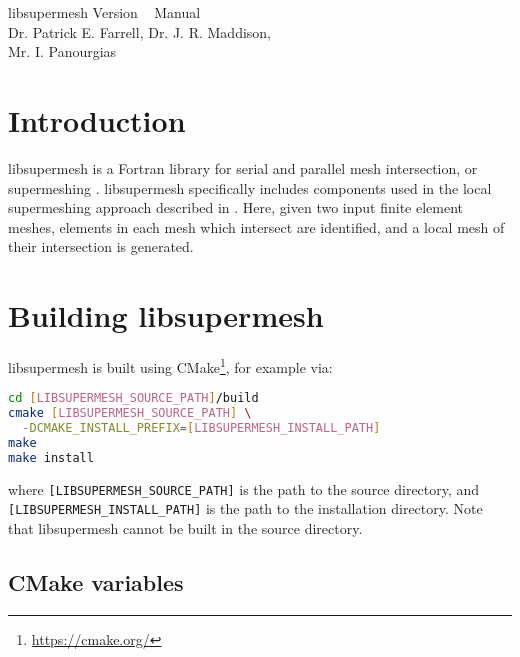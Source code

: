 \documentclass{article}
\begin{document}
\begin{titlepage}
\begin{center}

\Huge{libsupermesh Version \version~ Manual} \\[0.15\textheight]
\Large{Dr. Patrick E. Farrell, Dr. J. R. Maddison, \\ Mr. I. Panourgias}

\end{center}
\end{titlepage}

\tableofcontents

\section{Introduction}

libsupermesh is a Fortran library for serial and parallel mesh intersection, or
supermeshing \citep{farrell2009,farrell2009a}. libsupermesh specifically
includes components used in the local supermeshing approach described in
\citet{farrell2011}. Here, given two input finite element meshes, elements in
each mesh which intersect are identified, and a local mesh of their intersection
is generated.

\section{Building libsupermesh}

libsupermesh is built using CMake\footnote{\url{https://cmake.org/}}, for
example via:
\begin{lstlisting}[language=sh,frame=single]
cd [LIBSUPERMESH_SOURCE_PATH]/build
cmake [LIBSUPERMESH_SOURCE_PATH] \
  -DCMAKE_INSTALL_PREFIX=[LIBSUPERMESH_INSTALL_PATH]
make
make install
\end{lstlisting}
where \verb+[LIBSUPERMESH_SOURCE_PATH]+ is the path to the source directory, and
\linebreak \verb+[LIBSUPERMESH_INSTALL_PATH]+ is the path to the installation
directory. Note that libsupermesh cannot be built in the source directory.

\subsection*{CMake variables}
\end{document}
